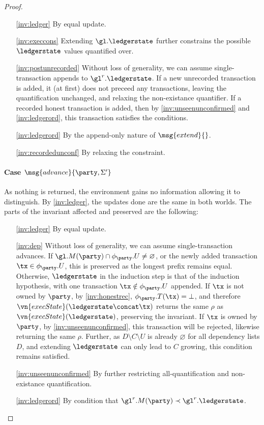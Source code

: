 \begin{proof}
\begin{enumerate}
  \item[\ref{inv:ledger}] By equal update.
  \item[\ref{inv:execcons}] Extending $\gl.\ledgerstate$ further constrains the
    possible $\ledgerstate$ values quantified over.
  \item[\ref{inv:postunrecorded}] Without loss of generality, we can assume
    single-trans\-action appends to $\gl^r.\ledgerstate$. If a new unrecorded
    transaction is added, it (at first) does not preceed any transactions,
    leaving the quantification unchanged, and relaxing the non-existance
    quantifier. If a recorded honest transaction is added, then by
    \ref{inv:unseenunconfirmed} and \ref{inv:ledgerord}, this transaction
    satisfies the conditions.
  \item[\ref{inv:ledgerord}] By the append-only nature of $\msg{extend}{}$.
  \item[\ref{inv:recordedunconf}] By relaxing the constraint.
\end{enumerate}

\paragraph{Case {\normalfont$\msg{advance}{\party, \Sigma'}$}}

As nothing is returned, the environment gains no information allowing it to
distinguish. By \ref{inv:ledger}, the updates done are the same in both
worlds. The parts of the invariant affected and preserved are the following:

\begin{enumerate}
  \item[\ref{inv:ledger}] By equal update.
  \item[\ref{inv:dep}] Without loss of generality, we can assume
    single-trans\-action advances. If $\gl.M(\party) \cap \phi_\party.U \neq
    \varnothing$, or the newly added transaction $\tx \in \phi_\party.U$, this
    is preserved as the longest prefix remains equal. Otherwise, $\ledgerstate$
    in the induction step is that of the induction hypothesis, with one
    transaction $\tx \notin \phi_\party.U$ appended. If $\tx$ is not owned by
    $\party$, by \ref{inv:honestrec}, $\phi_\party.T(\tx) = \bot$, and
    therefore $\vn{execState}(\ledgerstate \concat \tx)$ returns the same
    $\rho$ as $\vn{execState}(\ledgerstate)$, preserving the invariant. If
    $\tx$ is owned by $\party$, by \ref{inv:unseenunconfirmed}, this
    transaction will be rejected, likewise returning the same $\rho$. Further,
    as $D \setminus C \setminus U$ is already $\varnothing$ for all dependency
    lists $D$, and extending $\ledgerstate$ can only lead to $C$ growing, this
    condition remains satisfied.
  \item[\ref{inv:unseenunconfirmed}] By further restricting all-quantification
    and non-existance quantification.
  \item[\ref{inv:ledgerord}] By condition that $\gl^r.M(\party) \prec
    \gl^r.\ledgerstate$.
\end{enumerate}


\end{proof}
